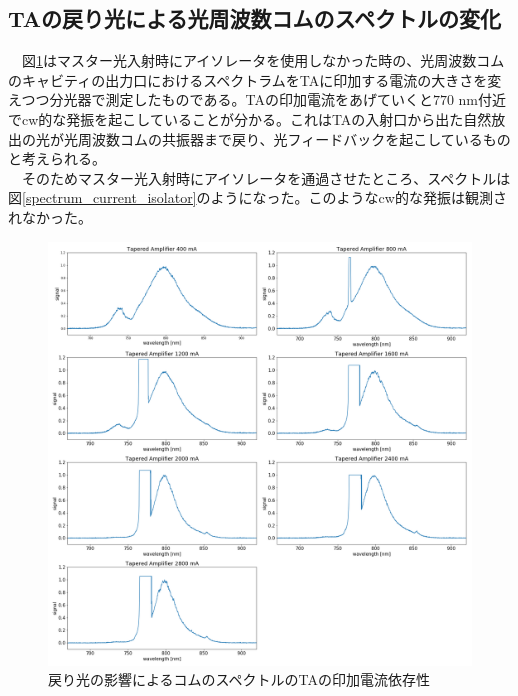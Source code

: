 \documentclass[uplatex, dvipdfmx, a4paper, report, papersize, 11pt]{jsbook}
\begin{document}
\subsection{TAの戻り光による光周波数コムのスペクトルの変化}
　図\ref{spectrum_current_MODORI}はマスター光入射時にアイソレータを使用しなかった時の、光周波数コムのキャビティの出力口におけるスペクトラムをTAに印加する電流の大きさを変えつつ分光器で測定したものである。TAの印加電流をあげていくと$770$ nm付近でcw的な発振を起こしていることが分かる。これはTAの入射口から出た自然放出の光が光周波数コムの共振器まで戻り、光フィードバックを起こしているものと考えられる。\\
　そのためマスター光入射時にアイソレータを通過させたところ、スペクトルは図\ref{spectrum_current_isolator}のようになった。このようなcw的な発振は観測されなかった。
\begin{figure}[H]
 \begin{center}
  \includegraphics[width=140mm]{figures/chapter4/spectrum_current_MODORI.png}
\end{center}
 \caption{戻り光の影響によるコムのスペクトルのTAの印加電流依存性}
 \label{spectrum_current_MODORI}
\end{figure}
\end{document}
